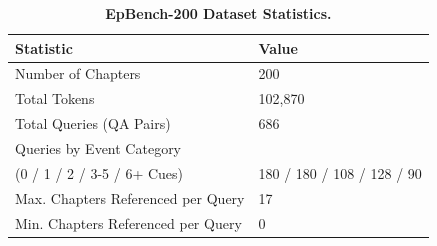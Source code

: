 

\begin{table}[htbp]
\centering
\small
\begin{tabular}{@{}ll@{}} %
\toprule
Statistic                               & Value \\
\midrule
Number of Chapters                      & 200 \\
Total Tokens                            & 102,870 \\
Total Queries (QA Pairs)                & 686 \\
Queries by Event Category               & \\ %
\quad (0 / 1 / 2 / 3-5 / 6+ Cues)     & 180 / 180 / 108 / 128 / 90 \\
\midrule
Max. Chapters Referenced per Query      & 17 \\
Min. Chapters Referenced per Query      & 0 \\
\bottomrule
\end{tabular}
\caption{\textbf{EpBench-200 Dataset Statistics.}}
\label{tab:dataset_stats_revised}
\end{table}